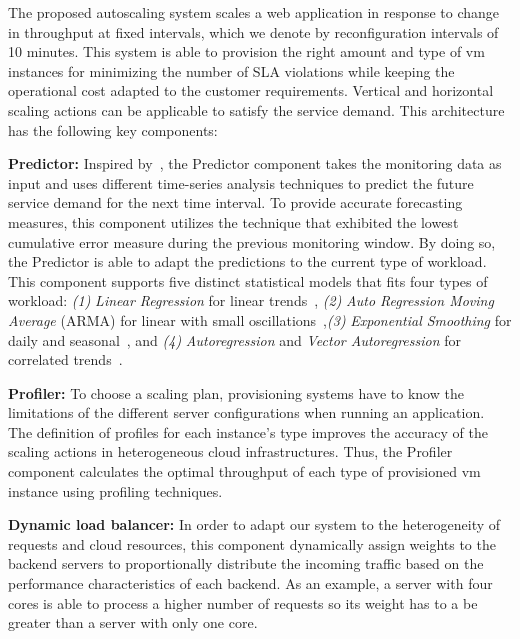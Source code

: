 

The proposed autoscaling system scales a web application in response to change in throughput at fixed intervals, which we denote by reconfiguration intervals of 10 minutes. This system is able to provision the right amount and type of vm instances for minimizing the number of SLA violations while keeping the operational cost adapted to the customer requirements. Vertical and horizontal scaling actions can be applicable to satisfy the service demand. This architecture has the following key components:

\vspace{2mm}

\textbf{Predictor: } Inspired by~\cite{wolski_network_1999}, the Predictor component takes the monitoring data as input and uses different time-series analysis techniques to predict the future service demand for the next time interval. To provide accurate forecasting measures, this component utilizes the technique that exhibited the lowest cumulative error measure during the previous monitoring window. By doing so, the Predictor is able to adapt the predictions to the current type of workload. This component supports five distinct statistical models that fits four types of workload: \emph{(1)} \emph{Linear Regression} for linear trends~\cite{muppala_regression-based_2012}, \emph{(2)} \emph{Auto Regression Moving Average} (ARMA) for linear with small oscillations~\cite{roy_efficient_2011},\emph{(3)} \emph{Exponential Smoothing} for daily and seasonal~\cite{exponential_smoothing2010}, and \emph{(4)} \emph{Autoregression} and \emph{Vector Autoregression} for correlated trends~\cite{chandra_dynamic_2003,vector_autoregression_2006}. 

\vspace{2mm}

\textbf{Profiler: } To choose a scaling plan, provisioning systems have to know the limitations of the different server configurations when running an application. The definition of profiles for each instance's type improves the accuracy of the scaling actions in heterogeneous cloud infrastructures. Thus, the Profiler component calculates the optimal throughput of each type of provisioned vm instance using profiling techniques.


\vspace{2mm}

\textbf{Dynamic load balancer: } In order to adapt our system to the heterogeneity of requests and cloud resources, this component dynamically assign weights to the backend servers to proportionally distribute the incoming traffic based on the performance characteristics of each backend. As an example, a server with four cores is able to process a higher number of requests so its weight has to a be greater than a server with only one core.

